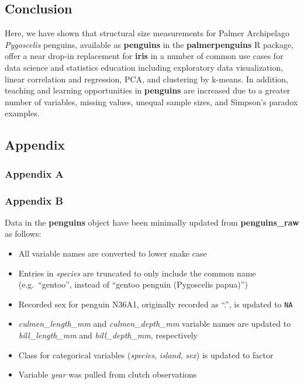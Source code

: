 \hypertarget{conclusion}{%
\subsection{Conclusion}\label{conclusion}}

Here, we have shown that structural size measurements for Palmer
Archipelago \emph{Pygoscelis} penguins, available as \textbf{penguins}
in the \textbf{palmerpenguins} R package, offer a near drop-in
replacement for \textbf{iris} in a number of common use cases for data
science and statistics education including exploratory data
visualization, linear correlation and regression, PCA, and clustering by
k-means. In addition, teaching and learning opportunities in
\textbf{penguins} are increased due to a greater number of variables,
missing values, unequal sample sizes, and Simpson's paradox examples.

\hypertarget{appendix}{%
\subsection{Appendix}\label{appendix}}

\hypertarget{appendix-a}{%
\subsubsection{Appendix A}\label{appendix-a}}

\hypertarget{appendix-b}{%
\subsubsection{Appendix B}\label{appendix-b}}

Data in the \textbf{penguins} object have been minimally updated from
\textbf{penguins\_raw} as follows:

\begin{itemize}
\tightlist
\item
  All variable names are converted to lower snake case
\item
  Entries in \emph{species} are truncated to only include the common
  name (e.g.~``gentoo'', instead of ``gentoo penguin (Pygoscelis
  papua)'')
\item
  Recorded sex for penguin N36A1, originally recorded as ``.'', is
  updated to \texttt{NA}
\item
  \emph{culmen\_length\_mm} and \emph{culmen\_depth\_mm} variable names
  are updated to \emph{bill\_length\_mm} and \emph{bill\_depth\_mm},
  respectively
\item
  Class for categorical variables (\emph{species}, \emph{island},
  \emph{sex}) is updated to factor
\item
  Variable \emph{year} was pulled from clutch observations
\end{itemize}

